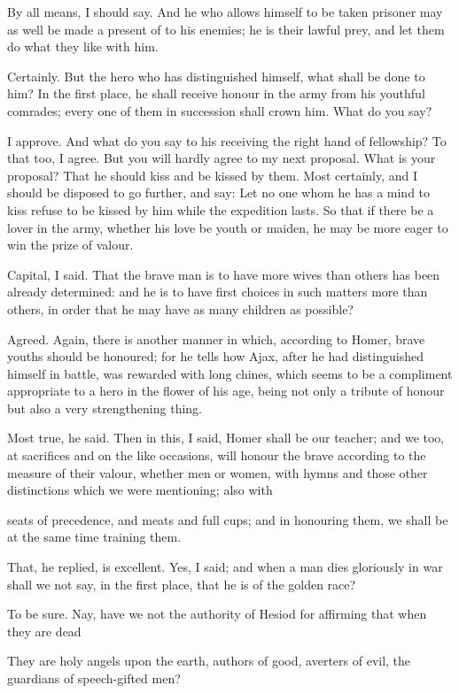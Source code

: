 By all means, I should say.
And he who allows himself to be taken prisoner may as well be made a present of to his enemies; he is their lawful prey, and let them do what they like with him.

Certainly.
But the hero who has distinguished himself, what shall be done to him? In the first place, he shall receive honour in the army from his youthful comrades; every one of them in succession shall crown him. What do you say?

I approve.
And what do you say to his receiving the right hand of fellowship?
To that too, I agree.
But you will hardly agree to my next proposal.
What is your proposal?
That he should kiss and be kissed by them.
Most certainly, and I should be disposed to go further, and say: Let no one whom he has a mind to kiss refuse to be kissed by him while the expedition lasts. So that if there be a lover in the army, whether his love be youth or maiden, he may be more eager to win the prize of valour.

Capital, I said. That the brave man is to have more wives than others has been already determined: and he is to have first choices in such matters more than others, in order that he may have as many children as possible?

Agreed.
Again, there is another manner in which, according to Homer, brave youths should be honoured; for he tells how Ajax, after he had distinguished himself in battle, was rewarded with long chines, which seems to be a compliment appropriate to a hero in the flower of his age, being not only a tribute of honour but also a very strengthening thing.

Most true, he said.
Then in this, I said, Homer shall be our teacher; and we too, at sacrifices and on the like occasions, will honour the brave according to the measure of their valour, whether men or women, with hymns and those other distinctions which we were mentioning; also with

seats of precedence, and meats and full cups; and in honouring them, we shall be at the same time training them.

That, he replied, is excellent.
Yes, I said; and when a man dies gloriously in war shall we not say, in the first place, that he is of the golden race?

To be sure.
Nay, have we not the authority of Hesiod for affirming that when they are dead

They are holy angels upon the earth, authors of good, averters of evil, the guardians of speech-gifted men?

